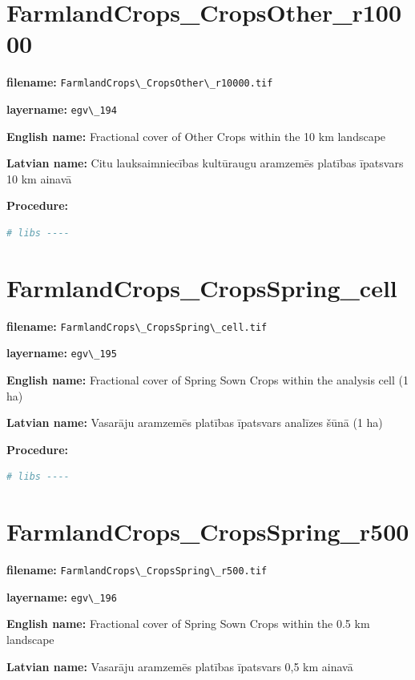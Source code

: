\documentclass[
]{book}
\newcommand{\passthrough}[1]{#1}
\begin{document}
\section{FarmlandCrops\_CropsOther\_r10000}\label{ch06.194}

\textbf{filename:} \passthrough{\lstinline!FarmlandCrops\_CropsOther\_r10000.tif!}

\textbf{layername:} \passthrough{\lstinline!egv\_194!}

\textbf{English name:} Fractional cover of Other Crops within the 10 km landscape

\textbf{Latvian name:} Citu lauksaimniecības kultūraugu aramzemēs platības īpatsvars 10 km ainavā

\textbf{Procedure:}

\begin{lstlisting}[language=R]
# libs ----
\end{lstlisting}

\section{FarmlandCrops\_CropsSpring\_cell}\label{ch06.195}

\textbf{filename:} \passthrough{\lstinline!FarmlandCrops\_CropsSpring\_cell.tif!}

\textbf{layername:} \passthrough{\lstinline!egv\_195!}

\textbf{English name:} Fractional cover of Spring Sown Crops within the analysis cell (1 ha)

\textbf{Latvian name:} Vasarāju aramzemēs platības īpatsvars analīzes šūnā (1 ha)

\textbf{Procedure:}

\begin{lstlisting}[language=R]
# libs ----
\end{lstlisting}

\section{FarmlandCrops\_CropsSpring\_r500}\label{ch06.196}

\textbf{filename:} \passthrough{\lstinline!FarmlandCrops\_CropsSpring\_r500.tif!}

\textbf{layername:} \passthrough{\lstinline!egv\_196!}

\textbf{English name:} Fractional cover of Spring Sown Crops within the 0.5 km landscape

\textbf{Latvian name:} Vasarāju aramzemēs platības īpatsvars 0,5 km ainavā
\end{document}
